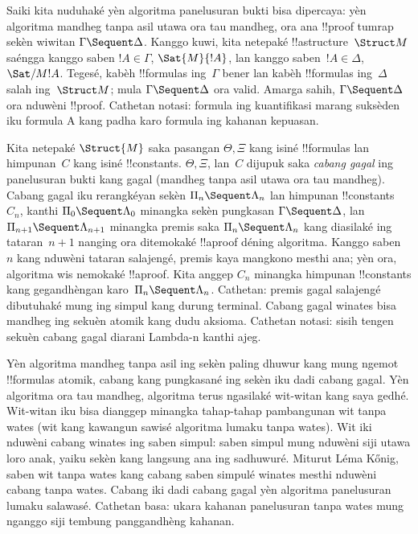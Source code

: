 \documentclass[../../../include/open-logic-section]{subfiles}
\begin{document}


Saiki kita nuduhaké yèn algoritma panelusuran bukti bisa
dipercaya: yèn algoritma mandheg tanpa asil utawa ora tau
mandheg, ora ana !!{proof} tumrap sekèn wiwitan
$\Gamma \Sequent \Delta$. Kanggo kuwi, kita netepaké
!!a{structure}~$\Struct M$ saéngga kanggo saben $!A \in \Gamma$,
$\Sat{M}{!A}$, lan kanggo saben~$!A \in \Delta$,
$\Sat/{M}{!A}$. Tegesé, kabèh !!{formula}s ing~$\Gamma$
bener lan kabèh !!{formula}s ing~$\Delta$ salah
ing~$\Struct M$; mula $\Gamma \Sequent \Delta$ ora valid.
Amarga  sahih, $\Gamma \Sequent \Delta$ ora nduwèni
!!{proof}.
Cathetan notasi: formula ing kuantifikasi marang suksèden iku formula A kang padha karo formula ing kahanan kepuasan.

Kita netepaké $\Struct{M}$ saka pasangan $\Theta, \Xi$
kang isiné !!{formula}s lan himpunan~$C$ kang isiné
!!{constant}s. $\Theta, \Xi$, lan~$C$ dijupuk saka
\emph{cabang gagal} ing panelusuran bukti kang gagal
(mandheg tanpa asil utawa ora tau mandheg). Cabang gagal
iku rerangkéyan sekèn $\Pi_n \Sequent \Lambda_n$ lan
himpunan !!{constant}s~$C_n$, kanthi
$\Pi_0 \Sequent \Lambda_0$ minangka sekèn pungkasan
$\Gamma \Sequent \Delta$, lan
$\Pi_{n+1} \Sequent \Lambda_{n+1}$ minangka premis saka
$\Pi_n \Sequent \Lambda_n$ kang diasilaké ing tataran~$n+1$
nanging ora ditemokaké !!a{proof} déning algoritma.
Kanggo saben~$n$ kang nduwèni tataran salajengé, premis
kaya mangkono mesthi ana; yèn ora, algoritma wis
nemokaké !!a{proof}. Kita anggep $C_n$ minangka himpunan
!!{constant}s kang gegandhèngan karo~$\Pi_n
\Sequent \Lambda_n$.
Cathetan: premis gagal salajengé dibutuhaké mung ing simpul kang durung terminal. Cabang gagal winates bisa mandheg ing sekuèn atomik kang dudu aksioma.
Cathetan notasi: sisih tengen sekuèn cabang gagal diarani Lambda-n kanthi ajeg.

Yèn algoritma mandheg tanpa asil ing sekèn paling dhuwur
kang mung ngemot !!{formula}s atomik, cabang kang pungkasané
ing sekèn iku dadi cabang gagal. Yèn algoritma ora tau
mandheg, algoritma terus ngasilaké wit-witan kang saya
gedhé. Wit-witan iku bisa dianggep minangka tahap-tahap
pambangunan wit tanpa wates (wit kang kawangun sawisé
algoritma lumaku tanpa wates). Wit iki nduwèni cabang
winates ing saben simpul: saben simpul mung nduwèni siji
utawa loro anak, yaiku sekèn kang langsung ana ing
sadhuwuré. Miturut Léma K\H{o}nig, saben wit tanpa wates
kang cabang saben simpulé winates mesthi nduwèni cabang
tanpa wates. Cabang iki dadi cabang gagal yèn algoritma
panelusuran lumaku salawasé.
Cathetan basa: ukara kahanan panelusuran tanpa wates mung nganggo siji tembung panggandhèng kahanan.
\end{document}
